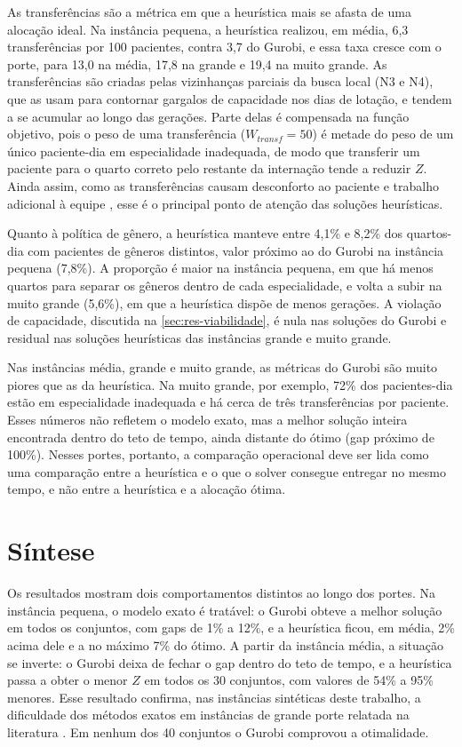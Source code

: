 As transferências são a métrica em que a heurística mais se afasta de uma alocação ideal. Na instância pequena, a heurística realizou, em média, 6,3 transferências por 100 pacientes, contra 3,7 do Gurobi, e essa taxa cresce com o porte, para 13,0 na média, 17,8 na grande e 19,4 na muito grande. As transferências são criadas pelas vizinhanças parciais da busca local (N3 e N4), que as usam para contornar gargalos de capacidade nos dias de lotação, e tendem a se acumular ao longo das gerações. Parte delas é compensada na função objetivo, pois o peso de uma transferência ($W_{transf} = 50$) é metade do peso de um único paciente-dia em especialidade inadequada, de modo que transferir um paciente para o quarto correto pelo restante da internação tende a reduzir $Z$. Ainda assim, como as transferências causam desconforto ao paciente e trabalho adicional à equipe \cite{demeester2010hybrid, schafer2023combining}, esse é o principal ponto de atenção das soluções heurísticas.

Quanto à política de gênero, a heurística manteve entre 4,1\% e 8,2\% dos quartos-dia com pacientes de gêneros distintos, valor próximo ao do Gurobi na instância pequena (7,8\%). A proporção é maior na instância pequena, em que há menos quartos para separar os gêneros dentro de cada especialidade, e volta a subir na muito grande (5,6\%), em que a heurística dispõe de menos gerações. A violação de capacidade, discutida na \autoref{sec:res-viabilidade}, é nula nas soluções do Gurobi e residual nas soluções heurísticas das instâncias grande e muito grande.

Nas instâncias média, grande e muito grande, as métricas do Gurobi são muito piores que as da heurística. Na muito grande, por exemplo, 72\% dos pacientes-dia estão em especialidade inadequada e há cerca de três transferências por paciente. Esses números não refletem o modelo exato, mas a melhor solução inteira encontrada dentro do teto de tempo, ainda distante do ótimo (gap próximo de 100\%). Nesses portes, portanto, a comparação operacional deve ser lida como uma comparação entre a heurística e o que o solver consegue entregar no mesmo tempo, e não entre a heurística e a alocação ótima.

\section{Síntese}
\label{sec:res-sintese}

Os resultados mostram dois comportamentos distintos ao longo dos portes. Na instância pequena, o modelo exato é tratável: o Gurobi obteve a melhor solução em todos os conjuntos, com gaps de 1\% a 12\%, e a heurística ficou, em média, 2\% acima dele e a no máximo 7\% do ótimo. A partir da instância média, a situação se inverte: o Gurobi deixa de fechar o gap dentro do teto de tempo, e a heurística passa a obter o menor $Z$ em todos os 30 conjuntos, com valores de 54\% a 95\% menores. Esse resultado confirma, nas instâncias sintéticas deste trabalho, a dificuldade dos métodos exatos em instâncias de grande porte relatada na literatura \cite{ceschia2012modeling, demeester2010hybrid}. Em nenhum dos 40 conjuntos o Gurobi comprovou a otimalidade.

